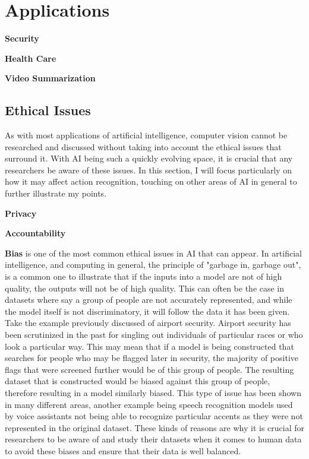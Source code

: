 \section{Applications}

\textbf{Security}

\textbf{Health Care}

\textbf{Video Summarization}

\subsection{Ethical Issues}

As with most applications of artificial intelligence, computer vision cannot be researched and discussed without taking into account the ethical issues that surround it. With AI being such a quickly evolving space, it is crucial that any researchers be aware of these issues. In this section, I will focus particularly on how it may affect action recognition, touching on other areas of AI in general to further illustrate my points.

\textbf{Privacy}

\textbf{Accountability}

\textbf{Bias} is one of the most common ethical issues in AI that can appear. In artificial intelligence, and computing in general, the principle of "garbage in, garbage out", is a common one to illustrate that if the inputs into a model are not of high quality, the outputs will not be of high quality. This can often be the case in datasets where say a group of people are not accurately represented, and while the model itself is not discriminatory, it will follow the data it has been given. Take the example previously discussed of airport security. Airport security has been scrutinized in the past for singling out individuals of particular races or who look a particular way. This may mean that if a model is being constructed that searches for people who may be flagged later in security, the majority of positive flags that were screened further would be of this group of people. The resulting dataset that is constructed would be biased against this group of people, therefore resulting in a model similarly biased. This type of issue has been shown in many different areas, another example being speech recognition models used by voice assistants not being able to recognize particular accents as they were not represented in the original dataset. These kinds of reasons are why it is crucial for researchers to be aware of and study their datasets when it comes to human data to avoid these biases and ensure that their data is well balanced.

